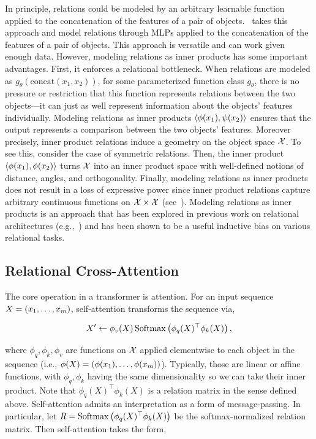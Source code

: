In principle, relations could be modeled by an arbitrary learnable function applied to the concatenation of the features of a pair of objects.~\citep{santoro1} takes this approach and model relations through MLPs applied to the concatenation of the features of a pair of objects. This approach is versatile and can work given enough data. However, modeling relations as inner products has some important advantages. First, it enforces a relational bottleneck. When relations are modeled as $g_\theta(\mathrm{concat}(x_1, x_2))$, for some parameterized function class $g_\theta$, there is no pressure or restriction that this function represents relations between the two objects---it can just as well represent information about the objects' features individually. Modeling relations as inner products $\left \langle \phi(x_1), \psi(x_2) \right\rangle$ ensures that the output represents a comparison between the two objects' features. Moreover precisely, inner product relations induce a geometry on the object space ${\mathcal{X}}$. To see this, consider the case of symmetric relations. Then, the inner product $\left \langle \phi(x_1), \phi(x_2) \right\rangle$ turns ${\mathcal{X}}$ into an inner product space with well-defined notions of distance, angles, and orthogonality. Finally, modeling relations as inner products does not result in a loss of expressive power since inner product relations capture arbitrary continuous functions on ${\mathcal{X}} \times {\mathcal{X}}$ (see~). Modeling relations as inner products is an approach that has been explored in previous work on relational architectures (e.g.,~\citep{esbn,kerg2022neural}) and has been shown to be a useful inductive bias on various relational tasks.

\subsection{Relational Cross-Attention}\label{ssec:relational_crossattention}

The core operation in a transformer is attention. For an input sequence $X = \left(x_1, \ldots, x_m\right)$, self-attention transforms the sequence via,

\begin{equation}\label{eq:self_attn}
    X' \gets \phi_v(X) \, \mathrm{Softmax}\left(\phi_q(X)^\top \phi_k(X)\right),
\end{equation}

\noindent where $\phi_q, \phi_k, \phi_v$ are functions on ${\mathcal{X}}$ applied elementwise to each object in the sequence (i.e., $\phi(X) = \left(\phi(x_1), \ldots, \phi(x_m)\right)$). Typically, those are linear or affine functions, with $\phi_q, \phi_k$ having the same dimensionality so we can take their inner product. Note that $\phi_q(X)^\top \phi_k(X)$ is a relation matrix in the sense defined above. Self-attention admits an interpretation as a form of message-passing. In particular, let $R = \mathrm{Softmax}\left(\phi_q(X)^\top \phi_k(X)\right)$ be the softmax-normalized relation matrix. Then self-attention takes the form,

